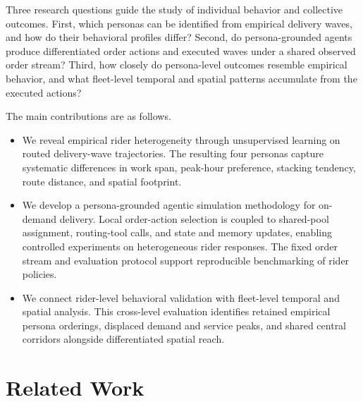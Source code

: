 \documentclass[letterpaper,journal]{IEEEtran}
\begin{document}
Three research questions guide the study of individual behavior and collective outcomes. First, which personas can be identified from empirical delivery waves, and how do their behavioral profiles differ? Second, do persona-grounded agents produce differentiated order actions and executed waves under a shared observed order stream? Third, how closely do persona-level outcomes resemble empirical behavior, and what fleet-level temporal and spatial patterns accumulate from the executed actions?

The main contributions are as follows.
\begin{itemize}
    \item We reveal empirical rider heterogeneity through unsupervised learning on routed delivery-wave trajectories. The resulting four personas capture systematic differences in work span, peak-hour preference, stacking tendency, route distance, and spatial footprint.
    \item We develop a persona-grounded agentic simulation methodology for on-demand delivery. Local order-action selection is coupled to shared-pool assignment, routing-tool calls, and state and memory updates, enabling controlled experiments on heterogeneous rider responses. The fixed order stream and evaluation protocol support reproducible benchmarking of rider policies.
    \item We connect rider-level behavioral validation with fleet-level temporal and spatial analysis. This cross-level evaluation identifies retained empirical persona orderings, displaced demand and service peaks, and shared central corridors alongside differentiated spatial reach.
\end{itemize}

\section{Related Work}
\end{document}
